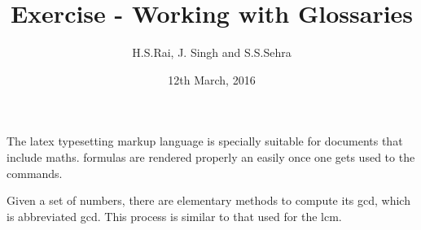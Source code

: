 \documentclass[11pt,a4paper]{article}
\title{Exercise - Working with Glossaries}
\date{12th March, 2016}
\author{H.S.Rai, J. Singh and S.S.Sehra}
\begin{document}
%
\maketitle
%
The \Gls{latex} typesetting markup language is specially suitable 
for documents that include \gls{maths}. \Glspl{formula} are 
rendered properly an easily once one gets used to the commands.
 
Given a set of numbers, there are elementary methods to compute 
its \acrlong{gcd}, which is abbreviated \acrshort{gcd}. This 
process is similar to that used for the \acrfull{lcm}.
%
\printglossary[title=Abbrevations, toctitle=List of terms,type=\acronymtype]
\printglossary
\end{document}
